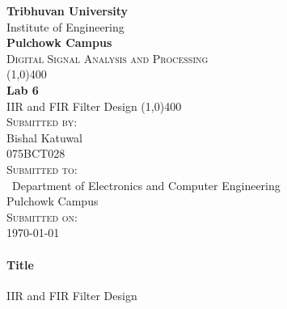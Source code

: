 \documentclass[12pt]{article}
\begin{document}
\begin{titlepage}
    \begin{center}
        \huge{\bfseries  Tribhuvan University}\\
        \Large{Institute of Engineering}\\
        \huge{ \bfseries  Pulchowk Campus}\\[3.2cm]


        \textsc{\Large Digital Signal Analysis and Processing}\\[-0.5cm]
        \line(1,0){400}\\
        \huge{\bfseries Lab 6}\\
        \large{IIR and FIR Filter Design}
        \line(1,0){400}\\


        \textsc{\Large Submitted by:}\\
        \Large Bishal Katuwal\\ \large 075BCT028\\    [0.85cm]

        \textsc{\Large Submitted to:}\\\
        \large Department of Electronics and Computer Engineering\\Pulchowk Campus\\    [0.85cm]
        
        \textsc{\Large Submitted on:}\\
        \today
        
    \end{center}
\end{titlepage}
\pagebreak
\paragraph{Title\\}
IIR and FIR Filter Design
\end{document}
